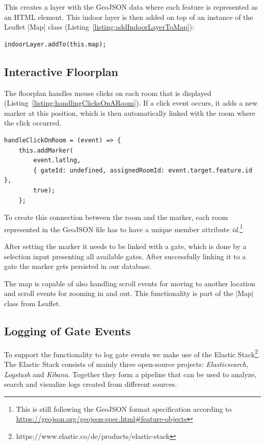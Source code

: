 This creates a layer with the GeoJSON data where each feature is represented as an HTML element.
This indoor layer is then added on top of an instance of the  Leaflet |Map|\cite{leaflet:map} class (Listing~\ref{listing:addIndoorLayerToMap}):

\begin{lstlisting}[label={listing:addIndoorLayerToMap},caption={Adding indoor layer to map}]
indoorLayer.addTo(this.map);
\end{lstlisting}


\subsection{Interactive Floorplan}
\label{Interactive Floorplan}

The floorplan handles mouse clicks on each room that is displayed (Listing~\ref{listing:handlingClicksOnARoom}). If a click event occurs, it adds a new marker at this position, which is then automatically linked with the room where the click occurred.

\begin{lstlisting}[label={listing:handlingClicksOnARoom},caption={Handling clicks on a room}]
handleClickOnRoom = (event) => {
    this.addMarker(
        event.latlng, 
        { gateId: undefined, assignedRoomId: event.target.feature.id }, 
        true);
    };
\end{lstlisting}

To create this connection between the room and the marker, each room represented in the GeoJSON file has to have a unique member attribute \emph{id}.\footnote{This is still following the GeoJSON format specification according to \url{https://geojson.org/geojson-spec.html\#feature-objects}}

After setting the marker it needs to be linked with a gate, which is done by a selection input presenting all available gates. After successfully linking it to a gate the marker gets persisted in our database.

The map is capable of also handling scroll events for moving to another location and scroll events for zooming in and out. This functionality is part of the |Map| class from Leaflet.

\subsection{Logging of Gate Events}
\label{Logging of Gate Events}

To support the functionality to log gate events we make use of the Elastic Stack\footnote{https://www.elastic.co/de/products/elastic-stack}.
The Elastic Stack consists of mainly three open-source projects: \emph{Elasticsearch}, \emph{Logstash} and \emph{Kibana}.
Together they form a pipeline that can be used to analyze, search and visualize logs created from different sources. 

